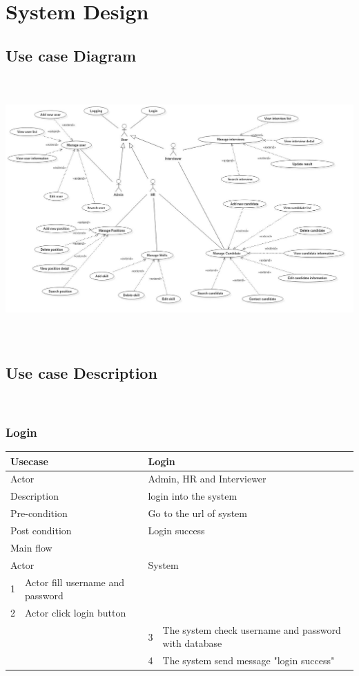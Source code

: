 \documentclass[a4paper]{article}
\begin{document}
\section{System Design}
\subsection{Use case Diagram}
\includegraphics[width=15cm, height=10cm]{Diagram/UseCase} \\
\subsection{Use case Description}\

\subsubsection{Login}
\begin{tabular}{|l|p{5cm}||l|p{5cm}|}
	\hline 
	\multicolumn{2}{|p{5cm}|}{Usecase} & \multicolumn{2}{|p{5cm}|}{Login}\\ 
	\hline 
	\multicolumn{2}{|p{5cm}|}{Actor} & \multicolumn{2}{|p{5cm}|}{Admin, HR and Interviewer} \\ 
	\hline 
	\multicolumn{2}{|p{5cm}|}{Description} & \multicolumn{2}{|p{5cm}|}{login into the system}\\
	\hline
	\multicolumn{2}{|p{5cm}|}{Pre-condition} & \multicolumn{2}{|p{5cm}|}{Go to the url of system}\\
	\hline
	\multicolumn{2}{|p{5cm}|}{Post condition} & \multicolumn{2}{|p{5cm}|}{Login success} \\
	\hline
	\multicolumn{4}{|l|}{Main flow} \\
	\hline
	\multicolumn{2}{|p{5cm}|}{Actor} & \multicolumn{2}{|p{5cm}|}{System} \\
	\hline
	1 & Actor fill username and password & & \\
	\hline
	2 & Actor click login button & &  \\
	\hline
	& & 3 & The system check username and password with database \\
	\hline 
	& & 4 & The system send message "login success"  \\
	\hline
\end{tabular}
\end{document}
